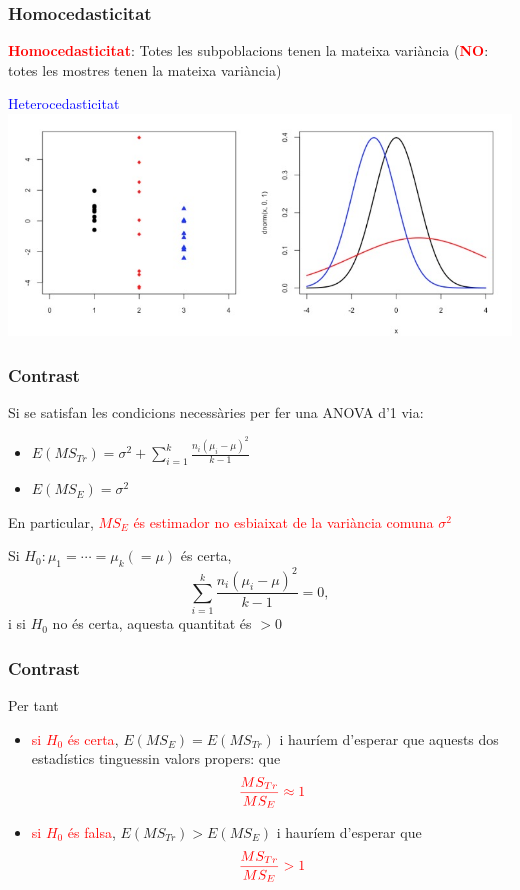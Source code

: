 \documentclass[12pt,t]{beamer}
\newcommand{\red}[1]{\textcolor{red}{#1}}
\newcommand{\blue}[1]{\textcolor{blue}{#1}}
\theoremstyle{plain}
\theoremstyle{definition}
\begin{document}
\begin{frame}
\frametitle{Homocedasticitat}

\red{\bf Homocedasticitat}: Totes les subpoblacions tenen la mateixa variància  (\red{\bf NO}: totes les mostres tenen la mateixa variància)

\begin{center}
\blue{Heterocedasticitat}\\[1ex]
\includegraphics[width=\linewidth]{heteroc}
\end{center}

\end{frame}



\begin{frame}
\frametitle{Contrast}

Si se satisfan les condicions necessàries per fer una ANOVA d'1 via:
\begin{itemize}
\item $E(MS_{Tr})=\displaystyle\sigma^2 + \sum_{i=1}^k \frac{n_i (\mu_i
-\mu)^2}{k-1}$
\medskip

\item $E(MS_E)=\sigma^2$
\end{itemize}
\bigskip

En particular, \red{$MS_E$ és estimador no esbiaixat de la variància comuna $\sigma^2$}
\pause\medskip


Si $H_0:\mu_1=\cdots=\mu_k (=\mu)$ és certa,
$$
\sum_{i=1}^k \frac{n_i (\mu_i -\mu)^2}{k-1}=0,
$$
i si $H_0$ no és certa, aquesta quantitat és $>0$

\end{frame}


\begin{frame}
\frametitle{Contrast}

Per tant
\medskip

\begin{itemize}
\item \red{si $H_0$ és certa}, $E(MS_E)=E(MS_{Tr})$ i hauríem d'esperar que aquests dos estadístics  tinguessin valors propers: que
$$
\red{\frac{MS_{Tr}}{MS_E}\approx 1}
$$
\item \red{si $H_0$ és falsa}, $E(MS_{Tr})>E(MS_E)$ i hauríem d'esperar que 
$$
\red{\frac{MS_{Tr}}{MS_E}> 1}
$$
\end{itemize}
\end{frame}
\end{document}
